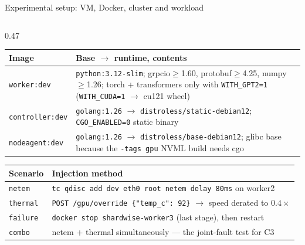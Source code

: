 \documentclass[aspectratio=169,9pt]{beamer}
\begin{document}
\begin{frame}[shrink=25]{Experimental setup: VM, Docker, cluster and workload}
\begin{columns}[T]
    \begin{column}{0.47\textwidth}
      \scriptsize
      \begin{tabularx}{\textwidth}{@{}p{1.5cm} X@{}}
        \toprule
        \color{keNavy}\bfseries Image & \color{keNavy}\bfseries Base $\to$ runtime, contents \\
        \midrule
        \texttt{worker:dev} & \texttt{python:3.12-slim}; grpcio$\ge$1.60,
          protobuf$\ge$4.25, numpy$\ge$1.26; torch + transformers only with
          \texttt{WITH\_GPT2=1} (\texttt{WITH\_CUDA=1} $\to$ cu121 wheel) \\
        \texttt{controller:dev} & \texttt{golang:1.26} $\to$
          \texttt{distroless/static-debian12}; \texttt{CGO\_ENABLED=0} static
          binary \\
        \texttt{nodeagent:dev} & \texttt{golang:1.26} $\to$
          \texttt{distroless/base-debian12}; glibc base because the
          \texttt{-tags gpu} NVML build needs cgo \\
        \bottomrule
      \end{tabularx}
      \vspace{0.5em}
      \begin{tabularx}{\textwidth}{@{}p{1.5cm} X@{}}
        \toprule
        \color{keNavy}\bfseries Scenario & \color{keNavy}\bfseries Injection method \\
        \midrule
        \texttt{netem} & \texttt{tc qdisc add dev eth0 root netem delay 80ms}
          on worker2 \\
        \texttt{thermal} & \texttt{POST /gpu/override \{"temp\_c": 92\}} $\to$
          speed derated to $0.4\times$ \\
        \texttt{failure} & \texttt{docker stop shardwise-worker3} (last
          stage), then restart \\
        \texttt{combo} & netem + thermal simultaneously --- the joint-fault
          test for C3 \\
        \bottomrule
      \end{tabularx}
    \end{column}
  \end{columns}
\end{frame}
\end{document}
